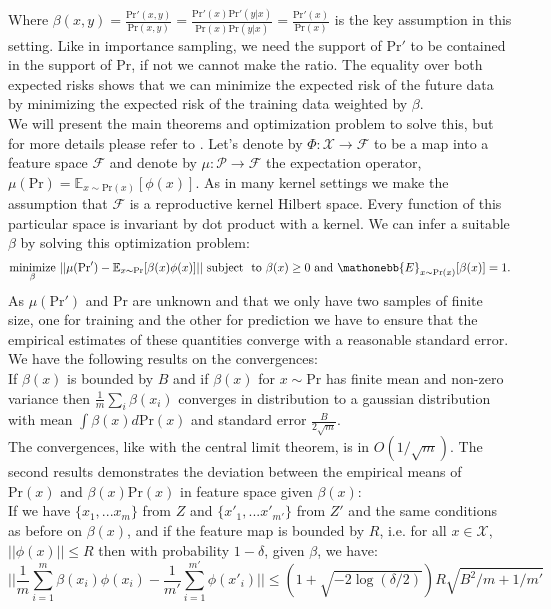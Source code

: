 \documentclass{article}
\newcommand{\PR}{\text{Pr}}
\begin{document}
Where $\beta(x,y)=\frac{\PR'(x,y)}{\PR(x,y)}=\frac{\PR'(x)\PR'(y|x)}{\PR(x)\PR(y|x)}=\frac{\PR'(x)}{\PR(x)}$ is the key assumption in this setting. Like in importance sampling, we need the support of $\PR'$ to be contained in the support of $\PR$, if not we cannot make the ratio. The equality over both expected risks shows that we can minimize the expected risk of the future data by minimizing the expected risk of the training data weighted by $\beta$. \\
We will present the main theorems and optimization problem to solve this, but for more details please refer to \cite{KMM}. Let's denote by $\Phi:\mathcal{X}\rightarrow \mathcal{F}$ to be a map into a feature space $\mathcal{F}$ and denote by $\mu:\mathcal{P}\rightarrow\mathcal{F}$ the expectation operator, $\mu(\PR)=\mathbb{E}_{x\sim\PR(x)}[\phi(x)]$. As in many kernel settings we make the assumption that $\mathcal{F}$ is a reproductive kernel Hilbert space. Every function of this particular space is invariant by dot product with a kernel. We can infer a suitable $\beta$ by solving this optimization problem:
$$ \underset{\beta}{\text{minimize}} \ ||\mu(\PR')-\mathbb{E}_{x\sim \PR}[\beta(x)\phi(x)]|| \text{\ subject \ to} \ \beta(x) \geq 0 \ \text{and} \ \mathonebb{E}_{x \sim \PR(x)}[\beta(x)]=1.$$
As $\mu(\PR')$ and $\PR$ are unknown and that we only have two samples of finite size, one for training and the other for prediction we have to ensure that the empirical estimates of these quantities converge with a reasonable standard error. We have the following results on the convergences: \\
If $\beta(x)$ is bounded by $B$ and if $\beta(x)$ for $x\sim \PR$ has finite mean and non-zero variance then $\frac{1}{m}\sum_i \beta(x_i)$ converges in distribution to a gaussian distribution with mean $\int \beta(x)d\PR(x)$ and standard error $\frac{B}{2\sqrt{m}}$. \\
The convergences, like with the central limit theorem, is in $O(1/\sqrt{m})$.
The second results demonstrates the deviation between the empirical means of $\PR(x)$
and $\beta(x)\PR(x)$ in feature space given $\beta(x)$: \\
If we have $\lbrace x_1,...x_m \rbrace$ from $Z$ and $\lbrace x'_1,...x'_{m'} \rbrace$ from $Z'$ and the same conditions as before on $\beta(x)$, and if the feature map is bounded by $R$, i.e. for all $x \in \mathcal{X}$, $||\phi (x)|| \leq R$ then with probability $1-\delta$, given $\beta$, we have:
$$||\frac{1}{m}\underset{i=1}{\overset{m}{\sum}}\beta(x_i)\phi(x_i) - \frac{1}{m'}\underset{i=1}{\overset{m'}{\sum}}\phi(x'_i)|| \leq (1+\sqrt{-2\log (\delta/2)})R\sqrt{B^2/m+1/m'}  $$
\end{document}
